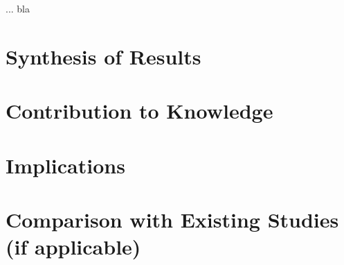 \cleardoublepage
\label{chap:5discussion}

... bla


\section{Synthesis of Results}




\section{Contribution to Knowledge}


\section{Implications}


\section{Comparison with Existing Studies (if applicable)}

